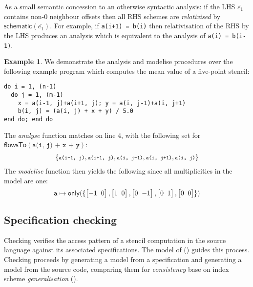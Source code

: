 \documentclass[10pt,preprint]{sigplanconf}
\newcounter{block}
\theoremstyle{definition}
\newtheorem{example}[block]{Example}
\newcommand{\vtwoh}[2]{\setlength{\arraycolsep}{0em}
\left[\begin{array}{cc}#1 \; & \; #2\end{array}\right]}
\begin{document}
As a small semantic concession to an otherwise syntactic
analysis: if the LHS $\overline{e_1}$ contains non-$0$ neighbour offsets
then all RHS schemes are \emph{relativised} by
$\textsf{schematic}(\overline{e_1})$. For example,
if \texttt{a(i+1) = b(i)} then relativisation of the RHS by the LHS
produces an analysis which is equivalent to the analysis of \texttt{a(i) = b(i-1)}.

\begin{example}
\label{exm:checking}
We demonstrate the analysis and modelise procedures over the
following example program which computes the mean value
of a five-point stencil:
\begin{verbatim}
do i = 1, (n-1)
  do j = 1, (m-1)
    x = a(i-1, j)+a(i+1, j); y = a(i, j-1)+a(i, j+1)
    b(i, j) = (a(i, j) + x + y) / 5.0
end do; end do
\end{verbatim}
%
The \textit{analyse} function matches on
line 4, with the following set for $\textsf{flowsTo}(\texttt{a(i, j) + x +
  y})$:
%
\begin{align*}
{\small{
\{\texttt{a(i-1, j)}, \texttt{a(i+1, j)}, \texttt{a(i, j-1)},
  \texttt{a(i, j+1)}, \texttt{a(i, j)}\}}}
\end{align*}
The \emph{modelise} function then yields the following
since all multiplicities in the model are one:
\begin{align*}
\texttt{a} \mapsto \mathsf{only}(\{\vtwoh{-1}{0}, \vtwoh{1}{0},
          \vtwoh{0}{-1}, \vtwoh{0}{1}, \vtwoh{0}{0}\})
\end{align*}
\end{example}


%

\subsection{Specification checking}
\label{subsec:checking}

Checking verifies the access pattern of a stencil computation in the
source language against its associated specifications. The model of
() guides this process.  Checking
proceeds by generating a model from a specification and generating
a model from the source code, comparing them for
\emph{consistency} base on index scheme
\emph{generalisation} ().
\end{document}
